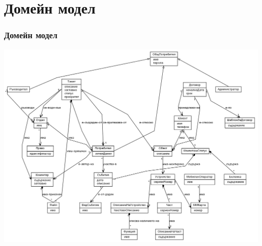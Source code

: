 \section{Домейн модел}
\begin{frame}
  \frametitle{Домейн модел}
  \includegraphics[width= 0.7\paperwidth]{../diagrams/domain.png}
\end{frame}
